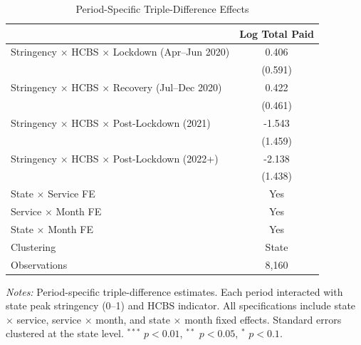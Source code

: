 \begin{table}[htbp]
\centering
\caption{Period-Specific Triple-Difference Effects}
\label{tab:periods}
\begin{tabular}{lc}
\hline\hline
 & Log Total Paid \\
\hline
Stringency $\times$ HCBS $\times$ Lockdown (Apr--Jun 2020) & 0.406 \\
 & (0.591) \\[3pt]
Stringency $\times$ HCBS $\times$ Recovery (Jul--Dec 2020) & 0.422 \\
 & (0.461) \\[3pt]
Stringency $\times$ HCBS $\times$ Post-Lockdown (2021) & -1.543 \\
 & (1.459) \\[3pt]
Stringency $\times$ HCBS $\times$ Post-Lockdown (2022+) & -2.138 \\
 & (1.438) \\[3pt]
\hline
State $\times$ Service FE & Yes \\
Service $\times$ Month FE & Yes \\
State $\times$ Month FE & Yes \\
Clustering & State \\
Observations & 8,160 \\
\hline\hline
\end{tabular}
\begin{minipage}{0.75\textwidth}
\vspace{4pt}
\footnotesize
\textit{Notes:} Period-specific triple-difference estimates. Each period interacted with state peak stringency (0--1) and HCBS indicator. All specifications include state $\times$ service, service $\times$ month, and state $\times$ month fixed effects. Standard errors clustered at the state level. $^{***}$ $p<0.01$, $^{**}$ $p<0.05$, $^{*}$ $p<0.1$.
\end{minipage}
\end{table}
